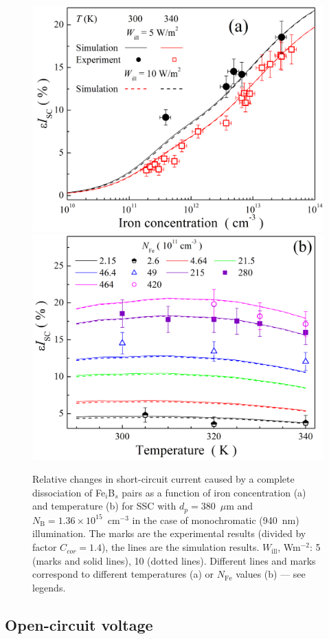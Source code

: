\documentclass[a4paper,fleqn]{cas-sc}
\begin{document}
\begin{figure}
	\centering
     \includegraphics[width=0.4\linewidth]{Fig5a.png}
     \includegraphics[width=0.4\linewidth]{Fig5b.png}
	  \caption{Relative changes in short-circuit current caused by a complete
       dissociation of Fe$_i$B$_s$ pairs as a function of iron concentration (a) and
       temperature (b) for SSC with $d_p=380$~$\mu$m and $N_\mathrm{B}=1.36\times10^{15}$~cm$^{-3}$
       in the case of monochromatic (940~nm) illumination.
       The marks are the experimental results (divided by factor $C_{cor}=1.4$), the lines are the simulation results.
       $W_\mathrm{ill}$, Wm$^{-2}$: 5 (marks and solid lines), 10 (dotted lines).
       Different lines and marks correspond to different temperatures (a) or $N_\mathrm{Fe}$ values (b) --- see legends.
}\label{fig5}
\end{figure}

\subsection{Open-circuit voltage}
\end{document}
